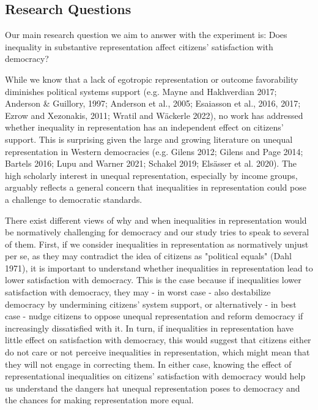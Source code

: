 \documentclass[12pt, letterpaper]{article}
\begin{document}
\begin{spacing}{1.5}


\section*{Research Questions}

Our main research question we aim to answer with the experiment is: Does inequality in substantive representation affect citizens’ satisfaction with democracy?

While we know that a lack of egotropic representation or outcome favorability diminishes political systems support (e.g. Mayne and Hakhverdian 2017; Anderson & Guillory, 1997; Anderson et al., 2005; Esaiasson et al., 2016, 2017; Ezrow and Xezonakis, 2011; Wratil and Wäckerle 2022), no work has addressed whether inequality in representation has an independent effect on citizens’ support. This is surprising given the large and growing literature on unequal representation in Western democracies (e.g. Gilens 2012; Gilens and Page 2014; Bartels 2016; Lupu and Warner 2021; Schakel 2019; Elsässer et al. 2020). The high scholarly interest in unequal representation, especially by income groups, arguably reflects a general concern that inequalities in representation could pose a challenge to democratic standards.

There exist different views of why and when inequalities in representation would be normatively challenging for democracy and our study tries to speak to several of them. First, if we consider inequalities in representation as normatively unjust per se, as they may contradict the idea of citizens as "political equals" (Dahl 1971), it is important to understand whether inequalities in representation lead to lower satisfaction with democracy. This is the case because if inequalities lower satisfaction with democracy, they may - in worst case - also destabilize democracy by undermining citizens' system support, or alternatively - in best case - nudge citizens to oppose unequal representation and reform democracy if increasingly dissatisfied with it. In turn, if inequalities in representation have little effect on satisfaction with democracy, this would suggest that citizens either do not care or not perceive inequalities in representation, which might mean that they will not engage in correcting them. In either case, knowing the effect of representational inequalities on citizens' satisfaction with democracy would help us understand the dangers hat unequal representation poses to democracy and the chances for making representation more equal.


\end{spacing}
\end{document}
